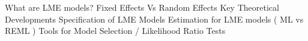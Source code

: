 What are LME models?
Fixed Effects Vs Random Effects
Key Theoretical Developments
Specification of LME Models
Estimation for LME models ( ML vs REML )
Tools for Model Selection / Likelihood Ratio Tests
